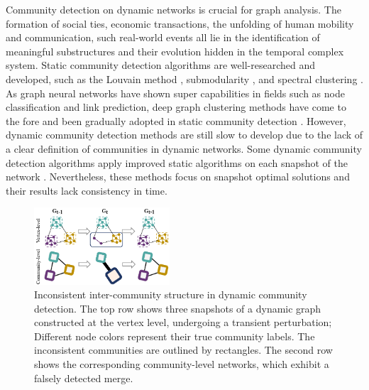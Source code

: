 \documentclass[letterpaper]{article} %
\begin{document}
Community detection on dynamic networks is crucial for graph analysis. The formation of social ties, economic transactions, the unfolding of human mobility and communication, such real-world events all lie in the identification of meaningful substructures and their evolution hidden in the temporal complex system. Static community detection algorithms are well-researched and developed, such as the Louvain method \cite{Blondel_2008}, submodularity \cite{liu2013entropy}, and spectral clustering \cite{spectralclustering}.
As graph neural networks have shown super capabilities in fields such as node classification and link prediction, deep graph clustering methods have come to the fore \cite{zhou2022comprehensive} and been gradually adopted in static community detection \cite{su2022comprehensive}. However, dynamic community detection methods are still slow to develop due to the lack of a clear definition of communities in dynamic networks. Some dynamic community detection algorithms apply improved static algorithms on each snapshot of the network \cite{javed2018community}. Nevertheless, these methods focus on snapshot optimal solutions and their results lack consistency in time.
\begin{figure}[] %
\centering 
\includegraphics[width=0.45\textwidth]{pic/motivation_update.pdf}
\caption{Inconsistent inter-community structure in dynamic community detection. The top row shows three snapshots of a dynamic graph constructed at the vertex level, undergoing a transient perturbation; Different node colors represent their true community labels.  The inconsistent communities are outlined by rectangles.   The second row shows   the corresponding community-level networks, which exhibit a falsely detected merge.} %
\label{Fig.motivation} %
\end{figure}
\end{document}
